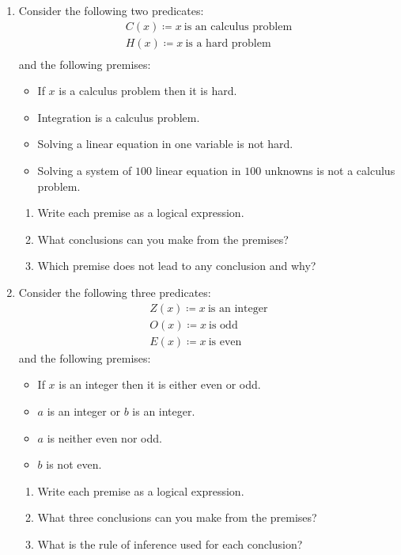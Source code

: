 \documentclass[letterpaper,12pt,fleqn]{article}
\begin{document}
\begin{enumerate}[left=0in,itemsep=0.5in]
\item Consider the following two predicates:
  \begin{gather*}
    C(x)\coloneqq x\ \text{is an calculus problem} \\
    H(x)\coloneqq x\ \text{is a hard problem} \\
  \end{gather*}
  and the following premises:
  \begin{itemize}
  \item If \(x\) is a calculus problem then it is hard.
  \item Integration is a calculus problem.
  \item Solving a linear equation in one variable is not hard.
  \item Solving a system of \(100\) linear equation in \(100\) unknowns is not a calculus problem.
  \end{itemize}
  \begin{enumerate}
  \item Write each premise as a logical expression.
  \item What conclusions can you make from the premises?
  \item Which premise does not lead to any conclusion and why?
  \end{enumerate}

\item Consider the following three predicates:
  \begin{gather*}
    Z(x)\coloneqq x\ \text{is an integer} \\
    O(x)\coloneqq x\ \text{is odd} \\
    E(x)\coloneqq x\ \text{is even}
  \end{gather*}
  and the following premises:
  \begin{itemize}
  \item If \(x\) is an integer then it is either even or odd.
  \item \(a\) is an integer or \(b\) is an integer.
  \item \(a\) is neither even nor odd.
  \item \(b\) is not even.
  \end{itemize}
  \begin{enumerate}
  \item Write each premise as a logical expression.
  \item What three conclusions can you make from the premises?
  \item What is the rule of inference used for each conclusion?
  \end{enumerate}


\end{enumerate}
\end{document}
